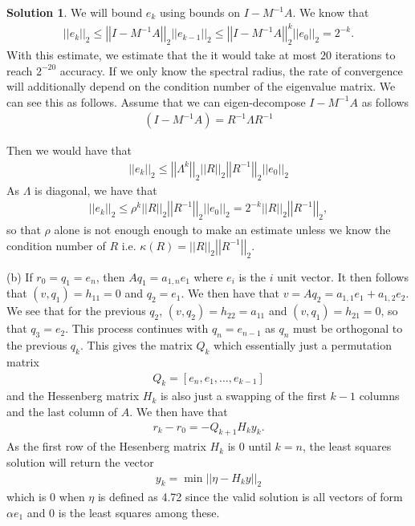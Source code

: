 \documentclass[12pt]{article}
\newcommand{\norm}[1]{ \left|\left| #1 \right|\right| }
\theoremstyle{definition}
\newtheorem{sol}{Solution}
\theoremstyle{remark}
\begin{document}
\begin{sol}
We will bound $e_{k}$ using bounds on $I- M^{-1}A$. We know that \begin{align*}
\norm{e_{k}}_{2} \leq \norm{I - M^{-1} A}_{2} \norm{e_{k-1}}_{2} \leq \norm{I - M^{-1} A}_{2}^{k} \norm{e_{0}}_{2} = 2^{-k}. %
\end{align*}
With this estimate, we estimate that the it would take at most $20$ iterations to reach  $2^{-20}$ accuracy. If we only know the spectral radius, the rate of convergence will additionally depend on the condition number of the eigenvalue matrix. We can see this as follows. Assume that we can eigen-decompose $I - M^{-1}A$ as follows
\begin{align*}
(I - M^{-1} A) = R^{-1} \Lambda R^{-1}
\end{align*}

Then we would have that
\begin{align*}
    \norm{e_{k}}_{2} \leq  \norm{\Lambda^{k}}_{2} \norm{R}_{2}\norm{R^{-1}}_{2} \norm{e_{0}}_{2}
\end{align*}
As $\Lambda$ is diagonal, we have that
 \begin{align*}
     \norm{e_{k}}_{2} \leq  \rho^{k} \norm{R}_{2}\norm{R^{-1}}_{2} \norm{e_{0}}_{2} = 2^{-k} \norm{R}_{2}\norm{R^{-1}}_{2},
\end{align*}
so that  $\rho$ alone is not enough enough to make an estimate unless we know  the condition number of  $R$ i.e.  $\kappa(R) = \norm{R}_{2}\norm{R^{-1}}_{2}$.

(b) If $r_0 = q_{1} = e_{n}$, then $A q_{1} = a_{1,n} e_{1}$ where $e_{i}$ is the $i$ unit vector. It then follows that $(v, q_{1}) = h_{11} = 0$ and $q_{2} = e_{1}$. We then have that $v = A q_{2} = a_{1,1} e_{1} + a_{1,2}e_{2}$. We see that for the previous $q_{2}$, $(v, q_{2}) = h_{22} = a_{11}$ and $(v, q_{1}) = h_{21} = 0$, so that $q_{3} = e_{2}$. This process continues with $q_{n} = e_{n-1}$ as $q_{n}$ must be orthogonal to the previous $q_{k}$. This gives the matrix $Q_{k}$ which essentially just a permutation matrix
\begin{align*}
    Q_{k} = [e_{n}, e_{1}, \ldots, e_{k-1}]
\end{align*}
and the Hessenberg matrix $H_{k}$ is also just a swapping of the first $k-1$ columns and the last column of $A$. We then have that
\begin{align*}
r_{k} - r_{0} = - Q_{k+1} H_{k} y_{k}.
\end{align*}
As the first row of the Hesenberg matrix $H_{k}$ is 0 until $k=n$, the least squares solution will return the vector
\begin{align*}
    y_{k} = \min \norm{ \eta - H_{k} y }_{2}
\end{align*}
which is 0 when $\eta$ is defined as 4.72 since the valid solution is all vectors of form $\alpha e_{1}$ and 0 is the least squares among these.


\end{sol}
\end{document}
